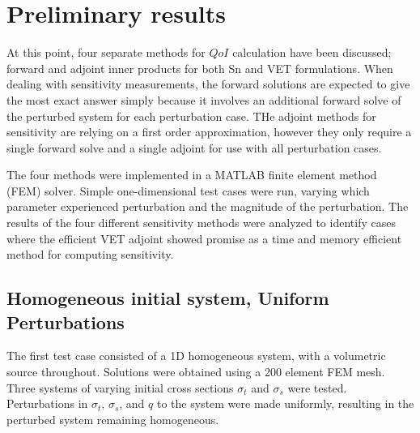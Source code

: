 \documentclass{article}
\newcommand{\sigt}{\sigma_t}
\newcommand{\sigs}{\sigma_s}
\newcommand{\scalSource}{q}
\newcommand{\qoi}{QoI}
\begin{document}
\section{Preliminary results}

At this point, four separate methods for $\qoi$ calculation have been discussed; forward and adjoint inner products for both Sn and VET formulations. When dealing with sensitivity measurements, the forward solutions are expected to give the most exact answer simply because it involves an additional forward solve of the perturbed system for each perturbation case. THe adjoint methods for sensitivity are relying on a first order approximation, however they only require a single forward solve and a single adjoint for use with all perturbation cases. 

The four methods were implemented in a MATLAB finite element method (FEM) solver. Simple one-dimensional test  cases were run, varying which parameter experienced perturbation and the magnitude of the perturbation. The results of the four different sensitivity methods were analyzed to identify cases where the efficient VET adjoint showed promise as a time and memory efficient method for computing sensitivity.
\subsection{Homogeneous initial system, Uniform Perturbations}
The first test case consisted of a 1D homogeneous system, with a volumetric source throughout. Solutions were obtained using a 200 element FEM mesh. Three systems of varying initial cross sections $\sigt$ and $\sigs$ were tested. Perturbations in $\sigt$, $\sigs$, and $\scalSource$ to the system were made uniformly, resulting in the perturbed system remaining homogeneous.
\end{document}
